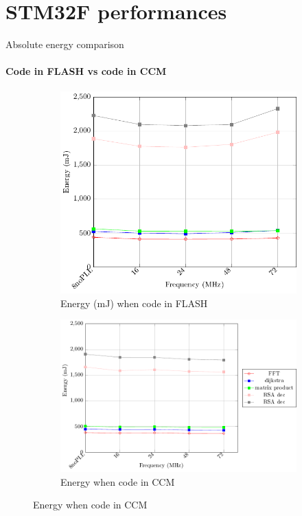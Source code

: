 \documentclass[
	11pt, %
]{beamer}
\begin{document}
\section{STM32F performances}
\begin{frame}{Absolute energy comparison}
	\framesubtitle{Code in FLASH vs code in CCM}
	\begin{figure}
		\begin{subfigure}{0.4\textwidth}
			\includegraphics[scale = 0.4]{data/stm32f_v2/abs/abs_flash_energy32f.pdf}
			\caption{Energy (mJ) when code in FLASH}
		\end{subfigure}
		\begin{subfigure}{0.4\textwidth}
			\includegraphics[scale = 0.4]{data/stm32f_v2/abs/abs_ccm_energy32f.pdf}
			\caption{Energy when code in CCM}
		\end{subfigure}
		

\end{figure}
\end{frame}
\end{document}

